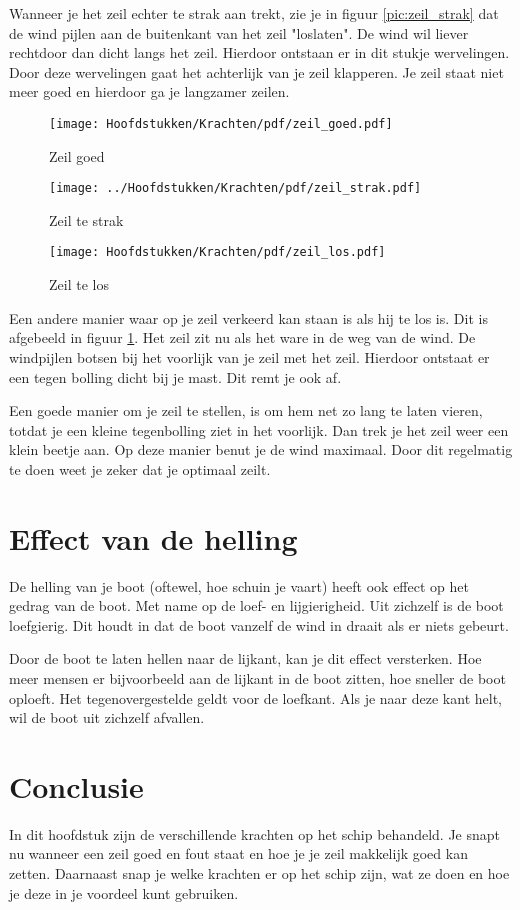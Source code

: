 Wanneer je het zeil echter te strak aan trekt, zie je in figuur \ref{pic:zeil_strak} dat de wind pijlen aan de buitenkant van het zeil "loslaten". De wind wil liever rechtdoor dan dicht langs het zeil. Hierdoor ontstaan er in dit stukje wervelingen. Door deze wervelingen gaat het achterlijk van je zeil klapperen. Je zeil staat niet meer goed en hierdoor ga je langzamer zeilen.    
\begin{figure}[H]
  \centering
  \begin{minipage}[b]{0.32\textwidth}
  \centering
    \texttt{[image: Hoofdstukken/Krachten/pdf/zeil\_goed.pdf]}
    \caption{Zeil goed}
    \label{pic:zeil_goed}
  \end{minipage}
  \hfill
  \begin{minipage}[b]{0.32\textwidth}
    \centering
    \texttt{[image: ../Hoofdstukken/Krachten/pdf/zeil\_strak.pdf]}
    \caption{Zeil te strak}
    \label{pic:zeil_strak}
    \end{minipage}
  \hfill
  \begin{minipage}[b]{0.32\textwidth}
    \centering
    \texttt{[image: Hoofdstukken/Krachten/pdf/zeil\_los.pdf]}
    \caption{Zeil te los}
    \label{pic:zeil_los}
  \end{minipage}
\end{figure}
Een andere manier waar op je zeil verkeerd kan staan is als hij te los is. Dit is afgebeeld in figuur \ref{pic:zeil_los}. Het zeil zit nu als het ware in de weg van de wind. De windpijlen botsen bij het voorlijk van je zeil met het zeil. Hierdoor ontstaat er een tegen bolling dicht bij je mast. Dit remt je ook af. 

Een goede manier om je zeil te stellen, is om hem net zo lang te laten vieren, totdat je een kleine tegenbolling ziet in het voorlijk. Dan trek je het zeil weer een klein beetje aan. Op deze manier benut je de wind maximaal. Door dit regelmatig te doen weet je zeker dat je optimaal zeilt. 
\section{Effect van de helling}
De helling van je boot (oftewel, hoe schuin je vaart) heeft ook effect op het gedrag van de boot. Met name op de loef- en lijgierigheid. Uit zichzelf is de boot loefgierig. Dit houdt in dat de boot vanzelf de wind in draait als er niets gebeurt. 

Door de boot te laten hellen naar de lijkant, kan je dit effect versterken. Hoe meer mensen er bijvoorbeeld aan de lijkant in de boot zitten, hoe sneller de boot oploeft. Het tegenovergestelde geldt voor de loefkant. Als je naar deze kant helt, wil de boot uit zichzelf afvallen. 
\section{Conclusie}
In dit hoofdstuk zijn de verschillende krachten op het schip behandeld. Je snapt nu wanneer een zeil goed en fout staat en hoe je je zeil makkelijk goed kan zetten. Daarnaast snap je welke krachten er op het schip zijn, wat ze doen en hoe je deze in je voordeel kunt gebruiken.  
